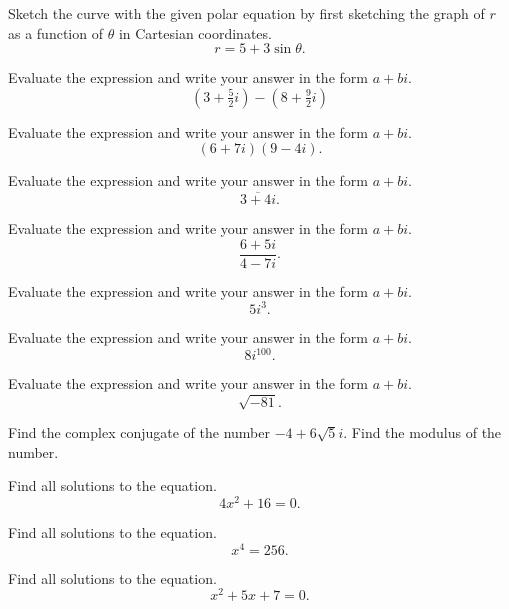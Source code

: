 \begin{problem}[WebAssign HW 35, \# 7]
Sketch the curve with the given polar equation by first sketching the graph
of $r$ as a function of $\theta$ in Cartesian coordinates.
\[
r=5+3\sin\theta.
\]
\end{problem}
\begin{problem}[WebAssign HW 35, \# 8]
Evaluate the expression and write your answer in the form $a+bi$.
\[
\left(3+\tfrac{5}{2}i\right)-\left(8+\tfrac{9}{2}i\right)
\]
\end{problem}
\begin{problem}[WebAssign HW 35, \# 9]
Evaluate the expression and write your answer in the form $a+bi$.
\[
(6+7i)(9-4i).
\]
\end{problem}
\begin{problem}[WebAssign HW 35, \# 10]
Evaluate the expression and write your answer in the form $a+bi$.
\[
\overline{3+4i}.
\]
\end{problem}
\begin{problem}[WebAssign HW 35, \# 11]
Evaluate the expression and write your answer in the form $a+bi$.
\[
\frac{6+5i}{4-7i}.
\]
\end{problem}
\begin{problem}[WebAssign HW 35, \# 12]
Evaluate the expression and write your answer in the form $a+bi$.
\[
5i^3.
\]
\end{problem}
\begin{problem}[WebAssign HW 35, \# 13]
Evaluate the expression and write your answer in the form $a+bi$.
\[
8i^{100}.
\]
\end{problem}
\begin{problem}[WebAssign HW 35, \# 14]
Evaluate the expression and write your answer in the form $a+bi$.
\[
\sqrt{-81}.
\]
\end{problem}
\begin{problem}[WebAssign HW 35, \# 15]
Find the complex conjugate of the number $-4+6\sqrt{5}i$. Find the modulus
of the number.
\end{problem}
\begin{problem}[WebAssign HW 35, \# 16]
Find all solutions to the equation.
\[
4x^2+16=0.
\]
\end{problem}
\begin{problem}[WebAssign HW 35, \# 17]
Find all solutions to the equation.
\[
x^4=256.
\]
\end{problem}
\begin{problem}[WebAssign HW 35, \# 18]
Find all solutions to the equation.
\[
x^2+5x+7=0.
\]
\end{problem}


